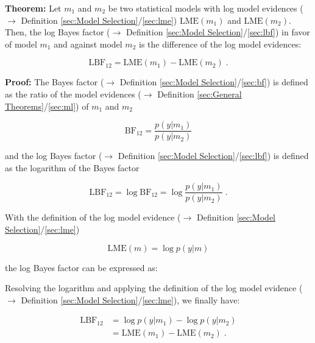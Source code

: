 \documentclass[a4paper,12pt,twoside]{book}
\begin{document}
\textbf{Theorem:} Let $m_1$ and $m_2$ be two statistical models with log model evidences ($\rightarrow$ Definition \ref{sec:Model Selection}/\ref{sec:lme}) $\mathrm{LME}(m_1)$ and $\mathrm{LME}(m_2)$. Then, the log Bayes factor ($\rightarrow$ Definition \ref{sec:Model Selection}/\ref{sec:lbf}) in favor of model $m_1$ and against model $m_2$ is the difference of the log model evidences:

\begin{equation} \label{eq:lbf-lme-LBF-LME}
\mathrm{LBF}_{12} = \mathrm{LME}(m_1) - \mathrm{LME}(m_2) \; .
\end{equation}


\vspace{1em}
\textbf{Proof:} The Bayes factor ($\rightarrow$ Definition \ref{sec:Model Selection}/\ref{sec:bf}) is defined as the ratio of the model evidences ($\rightarrow$ Definition \ref{sec:General Theorems}/\ref{sec:ml}) of $m_1$ and $m_2$

\begin{equation} \label{eq:lbf-lme-BF}
\mathrm{BF}_{12} = \frac{p(y|m_1)}{p(y|m_2)}
\end{equation}

and the log Bayes factor ($\rightarrow$ Definition \ref{sec:Model Selection}/\ref{sec:lbf}) is defined as the logarithm of the Bayes factor

\begin{equation} \label{eq:lbf-lme-LBF}
\mathrm{LBF}_{12} = \log \mathrm{BF}_{12} = \log \frac{p(y|m_1)}{p(y|m_2)} \; .
\end{equation}

With the definition of the log model evidence ($\rightarrow$ Definition \ref{sec:Model Selection}/\ref{sec:lme})

\begin{equation} \label{eq:lbf-lme-LME}
\mathrm{LME}(m) = \log p(y|m)
\end{equation}

the log Bayes factor can be expressed as:

Resolving the logarithm and applying the definition of the log model evidence ($\rightarrow$ Definition \ref{sec:Model Selection}/\ref{sec:lme}), we finally have:

\begin{equation} \label{eq:lbf-lme-LBF-LME-qed}
\begin{split}
\mathrm{LBF}_{12} &= \log p(y|m_1) - \log p(y|m_2) \\
&= \mathrm{LME}(m_1) - \mathrm{LME}(m_2) \; .
\end{split}
\end{equation}
\end{document}
